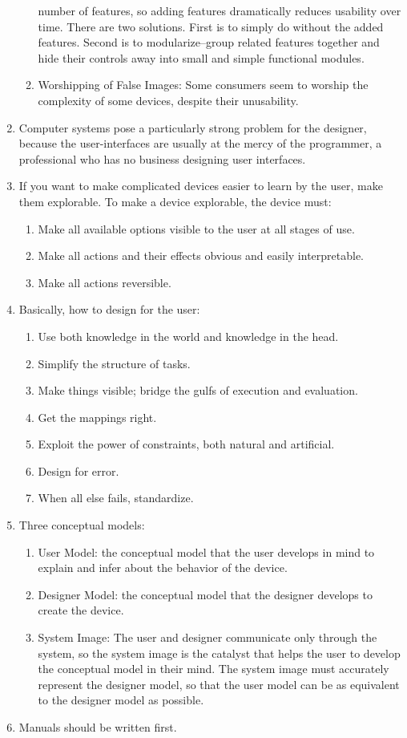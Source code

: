 \documentclass{designdoc}
\begin{document}
\begin{enumerate}
\begin{enumerate}
    number of features, so adding features dramatically reduces usability over
    time. There are two solutions. First is to simply do without the added
    features. Second is to modularize--group related features together and hide
    their controls away into small and simple functional modules.
  \item Worshipping of False Images: Some consumers seem to worship the
    complexity of some devices, despite their unusability.
  \end{enumerate}
\item Computer systems pose a particularly strong problem for the designer,
  because the user-interfaces are usually at the mercy of the programmer, a
  professional who has no business designing user interfaces.
\item If you want to make complicated devices easier to learn by the user, make
  them explorable. To make a device explorable, the device must:
  \begin{enumerate}
  \item Make all available options visible to the user at all stages of use.
  \item Make all actions and their effects obvious and easily interpretable.
  \item Make all actions reversible.
  \end{enumerate}
\item Basically, how to design for the user:
  \begin{enumerate}
  \item Use both knowledge in the world and knowledge in the head.
  \item Simplify the structure of tasks.
  \item Make things visible; bridge the gulfs of execution and evaluation.
  \item Get the mappings right.
  \item Exploit the power of constraints, both natural and artificial.
  \item Design for error.
  \item When all else fails, standardize.
  \end{enumerate}
\item Three conceptual models:
  \begin{enumerate}
  \item User Model: the conceptual model that the user develops in mind to
    explain and infer about the behavior of the device.
  \item Designer Model: the conceptual model that the designer develops to
    create the device.
  \item System Image: The user and designer communicate only through the
    system, so the system image is the catalyst that helps the user to develop
    the conceptual model in their mind. The system image must accurately
    represent the designer model, so that the user model can be as equivalent
    to the designer model as possible.
  \end{enumerate}
\item Manuals should be written first.
\end{enumerate}
\end{document}

